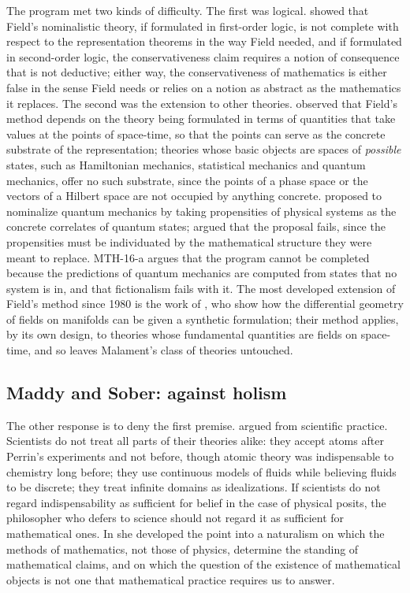 \documentclass{situationist-preprint}
\begin{document}
The program met two kinds of difficulty. The first was logical. \citet{Shapiro1983} showed that Field's nominalistic theory, if formulated in first-order logic, is not complete with respect to the representation theorems in the way Field needed, and if formulated in second-order logic, the conservativeness claim requires a notion of consequence that is not deductive; either way, the conservativeness of mathematics is either false in the sense Field needs or relies on a notion as abstract as the mathematics it replaces. The second was the extension to other theories. \citet{Malament1982} observed that Field's method depends on the theory being formulated in terms of quantities that take values at the points of space-time, so that the points can serve as the concrete substrate of the representation; theories whose basic objects are spaces of \emph{possible} states, such as Hamiltonian mechanics, statistical mechanics and quantum mechanics, offer no such substrate, since the points of a phase space or the vectors of a Hilbert space are not occupied by anything concrete. \citet{Balaguer1996} proposed to nominalize quantum mechanics by taking propensities of physical systems as the concrete correlates of quantum states; \citet{Bueno2003} argued that the proposal fails, since the propensities must be individuated by the mathematical structure they were meant to replace. MTH-16-a argues that the program cannot be completed because the predictions of quantum mechanics are computed from states that no system is in, and that fictionalism fails with it. The most developed extension of Field's method since 1980 is the work of \citet{ArntzeniusDorr2012}, who show how the differential geometry of fields on manifolds can be given a synthetic formulation; their method applies, by its own design, to theories whose fundamental quantities are fields on space-time, and so leaves Malament's class of theories untouched.

\subsection{Maddy and Sober: against holism}

The other response is to deny the first premise. \citet{Maddy1992} argued from scientific practice. Scientists do not treat all parts of their theories alike: they accept atoms after Perrin's experiments and not before, though atomic theory was indispensable to chemistry long before; they use continuous models of fluids while believing fluids to be discrete; they treat infinite domains as idealizations. If scientists do not regard indispensability as sufficient for belief in the case of physical posits, the philosopher who defers to science should not regard it as sufficient for mathematical ones. In \citet{Maddy1997} she developed the point into a naturalism on which the methods of mathematics, not those of physics, determine the standing of mathematical claims, and on which the question of the existence of mathematical objects is not one that mathematical practice requires us to answer.
\end{document}
